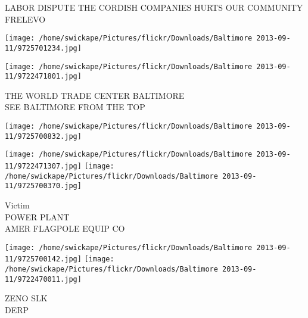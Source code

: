 \documentclass[10pt,letterpaper]{article}
\begin{document}
LABOR DISPUTE THE CORDISH COMPANIES HURTS OUR COMMUNITY\\
FRELEVO
\pagebreak

\texttt{[image: /home/swickape/Pictures/flickr/Downloads/Baltimore 2013-09-11/9725701234.jpg]}

\vspace{0.25in}
\texttt{[image: /home/swickape/Pictures/flickr/Downloads/Baltimore 2013-09-11/9722471801.jpg]}

THE WORLD TRADE CENTER BALTIMORE\\
SEE BALTIMORE FROM THE TOP
\pagebreak

\texttt{[image: /home/swickape/Pictures/flickr/Downloads/Baltimore 2013-09-11/9725700832.jpg]}

\vspace{0.25in}
\texttt{[image: /home/swickape/Pictures/flickr/Downloads/Baltimore 2013-09-11/9722471307.jpg]}
\texttt{[image: /home/swickape/Pictures/flickr/Downloads/Baltimore 2013-09-11/9725700370.jpg]}

Victim\\
POWER PLANT\\
AMER FLAGPOLE EQUIP CO
\pagebreak

\texttt{[image: /home/swickape/Pictures/flickr/Downloads/Baltimore 2013-09-11/9725700142.jpg]}
\texttt{[image: /home/swickape/Pictures/flickr/Downloads/Baltimore 2013-09-11/9722470011.jpg]}

ZENO SLK\\
DERP
\pagebreak
\end{document}
